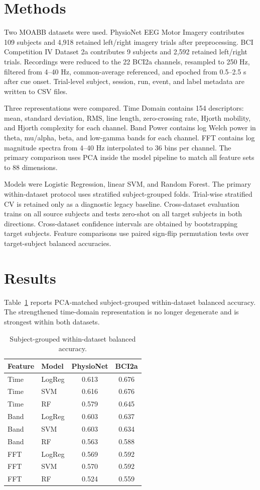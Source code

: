 \documentclass[10pt,twocolumn]{article}
\begin{document}
\section{Methods}
Two MOABB datasets were used. PhysioNet EEG Motor Imagery contributes 109
subjects and 4,918 retained left/right imagery trials after preprocessing.
BCI Competition IV Dataset 2a contributes 9 subjects and 2,592 retained
left/right trials. Recordings were reduced to the 22 BCI2a channels, resampled
to 250 Hz, filtered from 4--40 Hz, common-average referenced, and epoched from
0.5--2.5 s after cue onset. Trial-level subject, session, run, event, and label
metadata are written to CSV files.

Three representations were compared. Time Domain contains 154 descriptors:
mean, standard deviation, RMS, line length, zero-crossing rate, Hjorth mobility,
and Hjorth complexity for each channel. Band Power contains log Welch power in
theta, mu/alpha, beta, and low-gamma bands for each channel. FFT contains log
magnitude spectra from 4--40 Hz interpolated to 36 bins per channel. The
primary comparison uses PCA inside the model pipeline to match all feature
sets to 88 dimensions.

Models were Logistic Regression, linear SVM, and Random Forest. The primary
within-dataset protocol uses stratified subject-grouped folds. Trial-wise
stratified CV is retained only as a diagnostic legacy baseline. Cross-dataset
evaluation trains on all source subjects and tests zero-shot on all target
subjects in both directions. Cross-dataset confidence intervals are obtained by
bootstrapping target subjects. Feature comparisons use paired sign-flip
permutation tests over target-subject balanced accuracies.

\section{Results}
Table~\ref{tab:within} reports PCA-matched subject-grouped within-dataset
balanced accuracy. The strengthened time-domain representation is no longer
degenerate and is strongest within both datasets.

\begin{table}[t]
\centering
\caption{Subject-grouped within-dataset balanced accuracy.}
\label{tab:within}
\small
\begin{tabular}{@{}llcc@{}}
\toprule
Feature & Model & PhysioNet & BCI2a \\
\midrule
Time & LogReg & 0.613 & 0.676 \\
Time & SVM    & 0.616 & 0.676 \\
Time & RF     & 0.579 & 0.645 \\
\midrule
Band & LogReg & 0.603 & 0.637 \\
Band & SVM    & 0.603 & 0.634 \\
Band & RF     & 0.563 & 0.588 \\
\midrule
FFT  & LogReg & 0.569 & 0.592 \\
FFT  & SVM    & 0.570 & 0.592 \\
FFT  & RF     & 0.524 & 0.559 \\
\bottomrule
\end{tabular}
\end{table}
\end{document}
